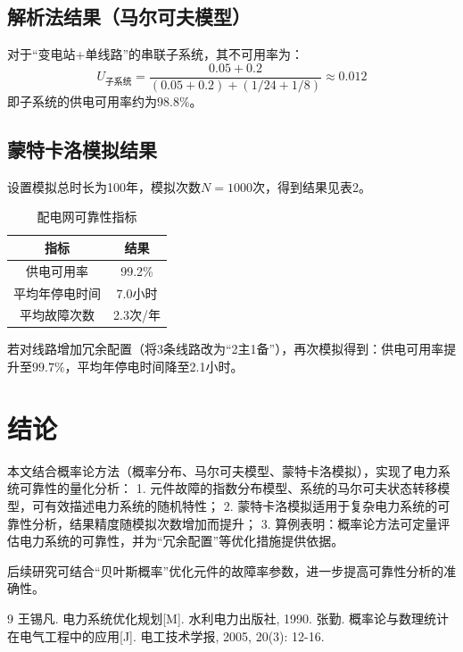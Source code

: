 \documentclass[12pt,a4paper]{article}
\begin{document}
\subsection{解析法结果（马尔可夫模型）}
对于“变电站+单线路”的串联子系统，其不可用率为：
\[
U_{\text{子系统}} = \frac{0.05 + 0.2}{(0.05 + 0.2) + (1/24 + 1/8)} \approx 0.012
\]
即子系统的供电可用率约为$98.8\%$。


\subsection{蒙特卡洛模拟结果}
设置模拟总时长为100年，模拟次数$N=1000$次，得到结果见表2。

\begin{table}[H]
\centering
\caption{配电网可靠性指标}
\begin{tabular}{c|c}
\hline
指标 & 结果 \\
\hline
供电可用率 & 99.2\% \\
平均年停电时间 & 7.0小时 \\
平均故障次数 & 2.3次/年 \\
\hline
\end{tabular}
\end{table}

若对线路增加冗余配置（将3条线路改为“2主1备”），再次模拟得到：供电可用率提升至$99.7\%$，平均年停电时间降至2.1小时。


\section{结论}
本文结合概率论方法（概率分布、马尔可夫模型、蒙特卡洛模拟），实现了电力系统可靠性的量化分析：
1. 元件故障的指数分布模型、系统的马尔可夫状态转移模型，可有效描述电力系统的随机特性；
2. 蒙特卡洛模拟适用于复杂电力系统的可靠性分析，结果精度随模拟次数增加而提升；
3. 算例表明：概率论方法可定量评估电力系统的可靠性，并为“冗余配置”等优化措施提供依据。

后续研究可结合“贝叶斯概率”优化元件的故障率参数，进一步提高可靠性分析的准确性。


\begin{thebibliography}{9}
 王锡凡. 电力系统优化规划[M]. 水利电力出版社, 1990.
 张勤. 概率论与数理统计在电气工程中的应用[J]. 电工技术学报, 2005, 20(3): 12-16.
\end{thebibliography}
\end{document}
